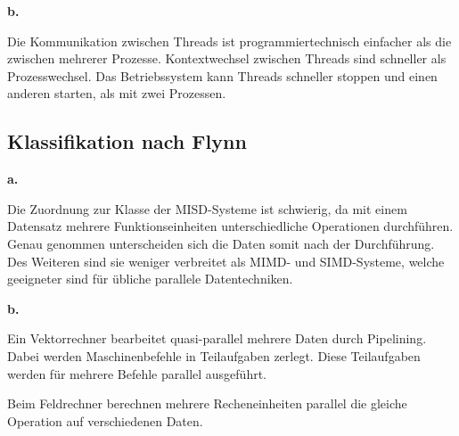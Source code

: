 \documentclass[12pt]{article}
\begin{document}
\noindent \textbf{b.}

Die Kommunikation zwischen Threads ist programmiertechnisch einfacher als die zwischen mehrerer Prozesse. Kontextwechsel zwischen Threads sind schneller als Prozesswechsel. Das Betriebssystem kann Threads schneller stoppen und einen anderen starten, als mit zwei Prozessen.

\subsection{Klassifikation nach Flynn}

\noindent \textbf{a.}

Die Zuordnung zur Klasse der MISD-Systeme ist schwierig, da mit einem Datensatz mehrere Funktionseinheiten unterschiedliche Operationen durchführen. Genau genommen unterscheiden sich die Daten somit nach der Durchführung. Des Weiteren sind sie weniger verbreitet als MIMD- und SIMD-Systeme, welche geeigneter sind für übliche parallele Datentechniken.

\noindent \textbf{b.}

Ein Vektorrechner bearbeitet quasi-parallel mehrere Daten durch Pipelining. Dabei werden Maschinenbefehle in Teilaufgaben zerlegt. Diese Teilaufgaben werden für mehrere Befehle parallel ausgeführt.

Beim Feldrechner berechnen mehrere Recheneinheiten parallel die gleiche Operation auf verschiedenen Daten.
\end{document}
